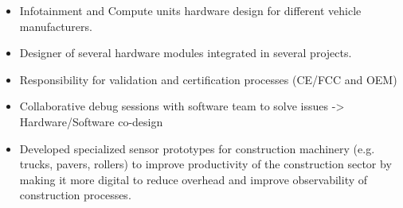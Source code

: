 \documentclass[10pt,a4paper,ragged2e]{altacv}
\begin{document}

\begin{fullwidth}
\makecvheader
\end{fullwidth}



\begin{itemize}
	\item Infotainment and Compute units hardware design for different vehicle manufacturers.
	\item Designer of several hardware modules integrated in several projects. 
	\item Responsibility for validation and certification processes (CE/FCC and OEM)
	\item Collaborative debug sessions with software team to solve issues -> Hardware/Software co-design
\end{itemize}

\divider

\begin{itemize}
	\item Developed specialized sensor prototypes for construction machinery (e.g. trucks, pavers, rollers) to improve productivity of the construction sector by making it more digital to reduce overhead and improve observability of construction processes.
\end{itemize}
\end{document}

